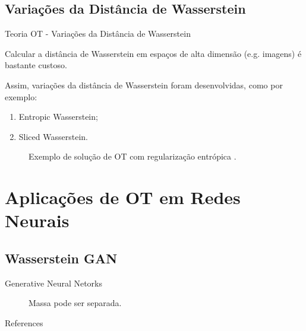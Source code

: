 \documentclass[10pt]{beamer}
\begin{document}
\subsection{Variações da Distância de Wasserstein}
\begin{frame}[fragile]{Teoria OT - Variações da Distância de Wasserstein}

	Calcular a distância de Wasserstein em espaços de alta dimensão (e.g. imagens)
	é bastante custoso.

	\vspace{3mm}
	Assim, variações da distância
	de Wasserstein foram desenvolvidas, como por exemplo:
	\begin{enumerate}
		\item Entropic Wasserstein;
		\item Sliced Wasserstein.
	\end{enumerate}

	\begin{figure}[H]
		\centering
		\def\svgscale{0.4}
		
		\caption{
			Exemplo de solução de OT com regularização entrópica
			\citep{sales2021optimal}.}
		\label{fig:pub}
	\end{figure}

\end{frame}

\AtBeginSection{}
\section[Aplicações OT]{Aplicações de OT em Redes Neurais}
\subsection[WGAN]{Wasserstein GAN}
\begin{frame}[fragile]{Generative Neural Netorks}

	\begin{figure}[H]
		\centering
		\def\svgscale{0.4}
		
		\caption{Massa pode ser separada.}
		\label{fig:kantorovichproblem}
	\end{figure}

\end{frame}



\begin{frame}[allowframebreaks]{References}
	\nocite{*}

	\renewcommand{\section}[2]{}%
	\tiny{}
	
\end{frame}
\end{document}
